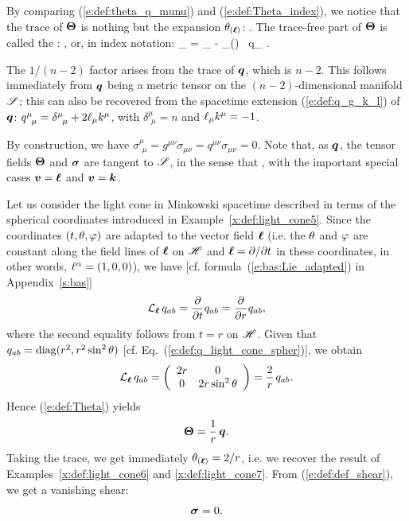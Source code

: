 By comparing (\ref{e:def:theta_q_munu}) and (\ref{e:def:Theta_index}), we
notice that the trace of $\bm{\Theta}$ is nothing but the expansion
$\theta_{(\bm{\ell})}$:
\be
   .
\ee
The trace-free part of $\bm{\Theta}$ is called the
:
\be \label{e:def:def_shear}
     ,
\ee
or, in index notation:
\be
    \sigma_{\alpha\beta} = \Theta_{\alpha\beta} -  \theta_{(\wl)} \, q_{\alpha\beta} .
\ee
\begin{remark}
The $1/(n-2)$ factor arises from the trace of $\bm{q}$, which is $n-2$.
This follows immediately from $\bm{q}$ being a metric tensor on the
$(n-2)$-dimensional manifold $\mathscr{S}$; this can also be recovered from the
spacetime extension (\ref{e:def:q_g_k_l}) of $\bm{q}$:
$q^\mu_{\ \, \mu} = \delta^\mu_{\ \, \mu} + 2 \el_\mu k^\mu$,
with $\delta^\mu_{\ \, \mu} = n$ and $\ell_\mu k^\mu=-1$.
\end{remark}
By construction, we have
$\sigma^\mu_{\ \, \mu} = g^{\mu\nu} \sigma_{\mu\nu} = q^{\mu\nu} \sigma_{\mu\nu} = 0$.
Note that, as $\bm{q}$, the tensor fields
$\bm{\Theta}$ and $\bm{\sigma}$ are tangent to $\mathscr{S}$, in the sense
that
\be \label{e:def:Theta_sigma_tangent}
   ,
\ee
with the important special cases $\bm{v} = \bm{\ell}$ and $\bm{v} = \bm{k}$.

\begin{example} \label{x:def:light_cone8}
Let us consider the light cone in Minkowski spacetime described in terms of the
spherical coordinates introduced in Example~\ref{x:def:light_cone5}.
Since the coordinates $(t,\theta,\varphi)$
are adapted to the vector field $\bm{\ell}$ (i.e. the $\theta$ and $\varphi$ are constant
along the field lines of $\bm{\ell}$ on $\mathscr{H}$ and $\bm{\ell} = \partial/\partial t$ in these
coordinates, in other words, $\ell^\alpha=(1,0,0)$), we have [cf. formula~(\ref{e:bas:Lie_adapted})
in Appendix~\ref{s:bas}]
\[
    {\mathcal{L}}_{\bm{\ell}}\, q_{ab} = \frac{\partial }{\partial t} q_{ab} = \frac{\partial }{\partial r} q_{ab} ,
\]
where the second equality follows from $t=r$ on $\mathscr{H}$. Given that
$q_{ab} = \mathrm{diag}(r^2, r^2\sin^2\theta)$
[cf. Eq.~(\ref{e:def:q_light_cone_spher})], we obtain
\[
    {\mathcal{L}}_{\bm{\ell}}\, q_{ab} = \left( \begin{array}{cc}
        2 r & 0  \\
        0 & 2 r \sin^2\theta
        \end{array} \right)
        = \frac{2}{r} \, q_{ab} .
\]
Hence (\ref{e:def:Theta}) yields
\[
    \bm{\Theta} = \frac{1}{r} \, \bm{q} .
\]
Taking the trace, we get immediately $\theta_{(\bm{\ell})} = 2/r$, i.e. we recover
the result of Examples~\ref{x:def:light_cone6} and \ref{x:def:light_cone7}.
From (\ref{e:def:def_shear}), we get a vanishing shear:
\[
    \bm{\sigma} = 0 .
\]
\end{example}

